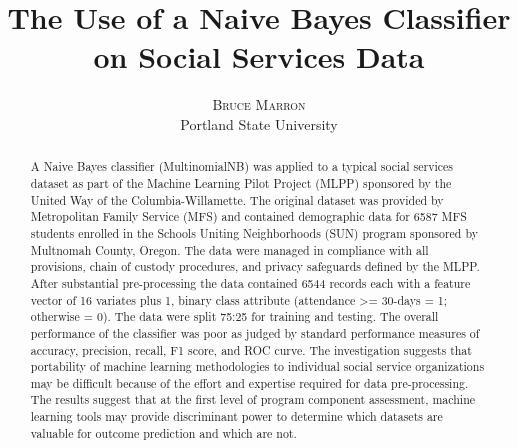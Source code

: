 \documentclass[twoside]{article}	%
\title{\vspace{-15mm}\fontsize{14pt}{10pt}\selectfont\textbf{The Use of a Naive Bayes Classifier on Social Services Data}} %
\author{
\large
\textsc{Bruce Marron} \\ %
\normalsize Portland State University \\ %
\vspace{-5mm}
}
\date{}
\begin{document}
\maketitle %
\thispagestyle{fancy} %


\begin{abstract}
\noindent A Naive Bayes classifier (MultinomialNB) was applied to a typical social services dataset as part of the Machine Learning Pilot Project (MLPP) sponsored by the United Way of the Columbia-Willamette. The original dataset was provided by Metropolitan Family Service (MFS) and contained demographic data for 6587 MFS students enrolled in the Schools Uniting Neighborhoods (SUN) program sponsored by Multnomah County, Oregon. The data were managed in compliance with all provisions, chain of custody procedures, and privacy safeguards defined by the MLPP. After substantial pre-processing the data contained 6544 records each with a feature vector of 16 variates plus 1, binary class attribute (attendance >= 30-days = 1; otherwise = 0). The data were split 75:25 for training and testing. The overall performance of the classifier was poor as judged by standard performance measures of accuracy, precision, recall, F1 score, and ROC curve. The investigation suggests that portability of machine learning methodologies to individual social service organizations may be difficult because of the effort and expertise required for data pre-processing. The results suggest that at the first level of program component assessment, machine learning tools may provide discriminant power to determine which datasets are valuable for outcome prediction and which are not.
\end{abstract}

\end{document}
